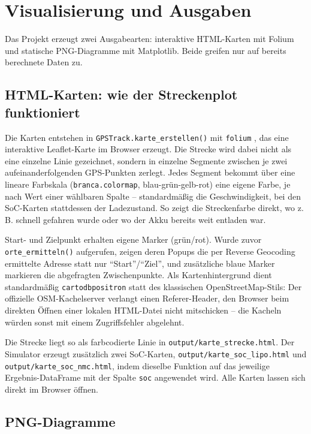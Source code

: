 \chapter{Visualisierung und Ausgaben}
\label{ch:visualisierung}

Das Projekt erzeugt zwei Ausgabearten: interaktive HTML-Karten mit Folium und statische PNG-Diagramme mit Matplotlib. Beide greifen nur auf bereits berechnete Daten zu.

\section{HTML-Karten: wie der Streckenplot funktioniert}

Die Karten entstehen in \texttt{GPSTrack.karte\_erstellen()} mit \texttt{folium} \cite{folium_docs}, das eine interaktive Leaflet-Karte im Browser erzeugt. Die Strecke wird dabei nicht als eine einzelne Linie gezeichnet, sondern in einzelne Segmente zwischen je zwei aufeinanderfolgenden GPS-Punkten zerlegt. Jedes Segment bekommt über eine lineare Farbskala (\texttt{branca.colormap}, blau-grün-gelb-rot) eine eigene Farbe, je nach Wert einer wählbaren Spalte -- standardmäßig die Geschwindigkeit, bei den SoC-Karten stattdessen der Ladezustand. So zeigt die Streckenfarbe direkt, wo z.\,B. schnell gefahren wurde oder wo der Akku bereits weit entladen war.

Start- und Zielpunkt erhalten eigene Marker (grün/rot). Wurde zuvor \texttt{orte\_ermitteln()} aufgerufen, zeigen deren Popups die per Reverse Geocoding ermittelte Adresse statt nur \enquote{Start}/\enquote{Ziel}, und zusätzliche blaue Marker markieren die abgefragten Zwischenpunkte. Als Kartenhintergrund dient standardmäßig \texttt{cartodbpositron} statt des klassischen OpenStreetMap-Stils: Der offizielle OSM-Kachelserver verlangt einen Referer-Header, den Browser beim direkten Öffnen einer lokalen HTML-Datei nicht mitschicken -- die Kacheln würden sonst mit einem Zugriffsfehler abgelehnt.

Die Strecke liegt so als farbcodierte Linie in \texttt{output/karte\_strecke.html}. Der Simulator erzeugt zusätzlich zwei SoC-Karten, \texttt{output/karte\_soc\_lipo.html} und \texttt{output/karte\_soc\_nmc.html}, indem dieselbe Funktion auf das jeweilige Ergebnis-DataFrame mit der Spalte \texttt{soc} angewendet wird. Alle Karten lassen sich direkt im Browser öffnen.

\section{PNG-Diagramme}

